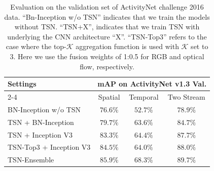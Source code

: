 \documentclass[10pt,journal,compsoc]{IEEEtran}
\begin{document}
\begin{table}[t]
  \centering
  \caption{Evaluation on the validation set of ActivityNet challenge 2016 data. ``Bn-Inception w/o TSN'' indicates that we train the models without TSN. ``TSN+X'', indicates that we train TSN with underlying the CNN architecture ``X''. ``TSN-Top3'' refers to the case where the top-$ \mathcal{K} $ aggregation function is used with $ \mathcal{K} $ set to $ 3 $. Here we use the fusion weights of 1:0.5 for RGB and optical flow, respectively.}
  \vspace{-10pt}
  \label{tbl:anet_1-3_val}
  \begin{tabular}{|l|c|c|c|}
    \hline
    \multirow{2}{*}{Settings} & \multicolumn{3}{c|}{mAP on ActivityNet v1.3 Val.}                                                         \\ \cline{2-4} 
    & Spatial                           & Temporal                          & Two Stream                        \\ \hline
    BN-Inception w/o TSN      & \multicolumn{1}{c|}{$76.6\%$} & \multicolumn{1}{c|}{$52.7\%$} & \multicolumn{1}{c|}{$78.9\%$} \\ \hline
    TSN + BN-Inception        & $79.7\%$                      & $63.6\%$                      & $84.7\%$                      \\ \hline
    TSN + Inception V3        & $83.3\%$                      & $64.4\%$                      & $87.7\%$                      \\ \hline
    TSN-Top3 + Inception V3   & $84.5\%$                      & $64.0\%$                      & $88.0\%$                      \\ \hline
    TSN-Ensemble              & $ 85.9\% $        & $ 68.3\% $      & $\mathbf{89.7\%}$ \\ \hline
  \end{tabular}
  \vspace{-10pt}
\end{table}
\end{document}
